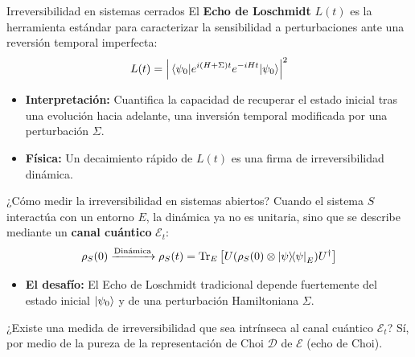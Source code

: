 \documentclass[10pt,handout]{beamer}
\newcommand{\mcD}{\mathcal{D}}
\begin{document}
\begin{frame}{Irreversibilidad en sistemas cerrados}
    El \textbf{Echo de Loschmidt} $L(t)$ es la herramienta estándar para caracterizar la sensibilidad a perturbaciones ante una reversión temporal imperfecta:
    \[ L(t) = \abs{\mel{\psi_0}{e^{i(H+\Sigma)t} e^{-iHt}}{\psi_0}}^2 \]
    
    \begin{itemize}
        \item \textbf{Interpretación:} Cuantifica la capacidad de recuperar el estado inicial tras una evolución hacia adelante, una inversión temporal modificada por una perturbación $\Sigma$.
        \begin{center}
        \end{center}
        \item \textbf{Física:} Un decaimiento rápido de $L(t)$ es una firma de \alert{irreversibilidad dinámica}.
    \end{itemize}
\cite{goussev_2012_loschmidt,gorin_2006_dynamics}
\end{frame}

\begin{frame}{¿Cómo medir la irreversibilidad en sistemas abiertos?}
    Cuando el sistema $S$ interactúa con un entorno $E$, la dinámica ya no es unitaria, sino que se describe mediante un \textbf{canal cuántico} $\mathcal{E}_t$:
    \[ \rho_S(0) \xrightarrow{\text{Dinámica}} \rho_S(t) = \Tr_E \qty[ U ( \rho_S(0) \otimes \dyad{\psi}_E ) U^\dagger ] \]

    \begin{itemize}
        \item \textbf{El desafío:} El Echo de Loschmidt tradicional depende fuertemente del estado inicial $\ket{\psi_0}$ y de una perturbación Hamiltoniana $\Sigma$.
    \end{itemize}

\begin{alertblock}{¿Existe una medida de irreversibilidad que sea intrínseca al canal cuántico $\mathcal{E}_t$? }
Sí, por medio de la pureza de la representación de Choi $\mcD$ de $\mathcal E$ (\alert{echo de Choi}).
\end{alertblock}
\end{frame}
\end{document}
